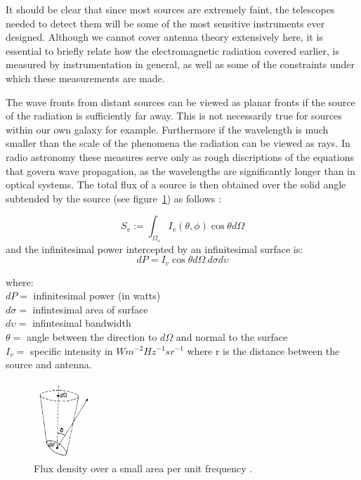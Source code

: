 \documentclass[a4paper,10pt]{report}
\begin{document}
It should be clear that since most sources are extremely faint, the telescopes needed to detect them will be some of the most sensitive instruments ever designed. Although we cannot
cover antenna theory extensively here, it is essential to briefly relate how the electromagnetic radiation covered earlier, is measured by instrumentation in general, as well as some of the constraints under which
these measurements are made.

The wave fronts from distant sources can be viewed as planar fronts if the source of the radiation is sufficiently far away. This is not necessarily true for sources within our own galaxy for example. Furthermore 
if the wavelength is much smaller than the scale of the phenomena the radiation can be viewed as rays. In radio astronomy these measures serve only as rough discriptions of the 
equations that govern wave propagation, as the wavelengths are significantly longer than in optical systems.  The total flux of a source is then obtained over the solid angle subtended by the 
source (see figure~\ref{fig_measuring_source_brightness}) as follows \cite{wilson2009tools}:

  \begin{equation}
    S_v := \int_{\Omega_s}{I_v(\theta,\phi)\cos{\theta}d\Omega}
  \end{equation}
  and the infinitesimal power intercepted by an infinitesimal surface is:
  \begin{equation}
    dP = I_v\cos{\theta}d\Omega\ d\sigma d\upsilon
  \end{equation}

  where:\\
  $dP = $ infinitesimal power (in watts)\\
  $d\sigma = $ infintesimal area of surface\\
  $d\upsilon = $ infintesimal bandwidth\\
  $\theta = $ angle between the direction to $d\Omega$ and normal to the surface\\
  $I_{v} =$ specific intensity in $Wm^{-2}Hz^{-1}sr^{-1}$ where r is the distance between the source and antenna.\\
  
\begin{figure}[ht]
\begin{mdframed}
 \centering
 \includegraphics[width=0.2\textwidth]{images/measuring_source_brightness.png}
 \caption[Source brightness]{Flux density over a small area per unit frequency \cite{wilson2009tools}.}
 \label{fig_measuring_source_brightness}
\end{mdframed}
\end{figure}
\end{document}
